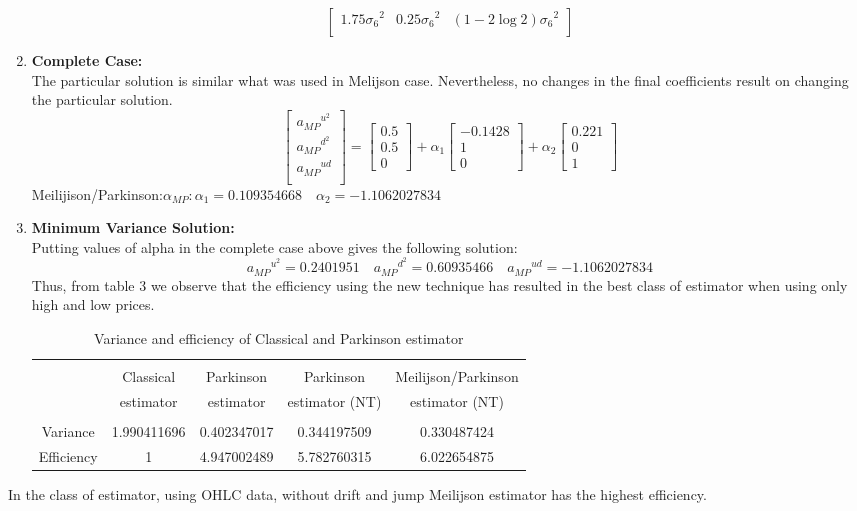 \documentclass[12pt]{article}   	%
\begin{document}
\begin{enumerate}
$$\begin{bmatrix}
1.75\sigma_6{^2} &0.25\sigma_6{^2} & (1-2\log 2)\sigma_6{^2} \\
\end{bmatrix}$$
\item \textbf{Complete Case:}\\
The particular solution is similar what was used in Melijson case. Nevertheless, no changes in the final coefficients result on changing the particular solution.
$$\begin{bmatrix}
{a_{MP}}^{u^2}\\
{a_{MP}}^{d^2}\\
{a_{MP}}^{ud}\\
\end{bmatrix}=
\begin{bmatrix}
0.5\\
0.5\\
0\end{bmatrix}+\alpha_1
\begin{bmatrix}
-0.1428\\
1\\
0\end{bmatrix}+\alpha_2
\begin{bmatrix}
0.221\\
0\\
1\end{bmatrix}
$$
Meilijison/Parkinson:\quad $\alpha_{MP}: \alpha_1=0.109354668\quad \alpha_2=-1.1062027834$ 
\item \textbf{Minimum Variance Solution:}\\
Putting values of alpha in the complete case above gives the following solution:\\
$${a_{MP}}^{u^2}=0.2401951\quad{a_{MP}}^{d^2}=0.60935466\quad{a_{MP}}^{ud}=-1.1062027834$$
Thus, from table 3 we observe that the efficiency using the new technique has resulted in the best class of estimator when using only high and low prices.
\begin{table}[ht]
\centering
\caption{Variance and efficiency of Classical and Parkinson estimator}
\begin{tabular}{ccccc}
\hline\hline\\[0.01ex]
&Classical&Parkinson &Parkinson&Meilijson/Parkinson\\
&estimator&estimator&estimator (NT)&estimator (NT)
\\\hline\\
Variance&1.990411696&0.402347017
&0.344197509&0.330487424
\\[1.5ex]
Efficiency&1&4.947002489&5.782760315&6.022654875
\\
\hline
\end{tabular}
\end{table}

\end{enumerate}
In the class of estimator, using OHLC data, without drift and jump Meilijson estimator has the highest efficiency.
\end{document}
